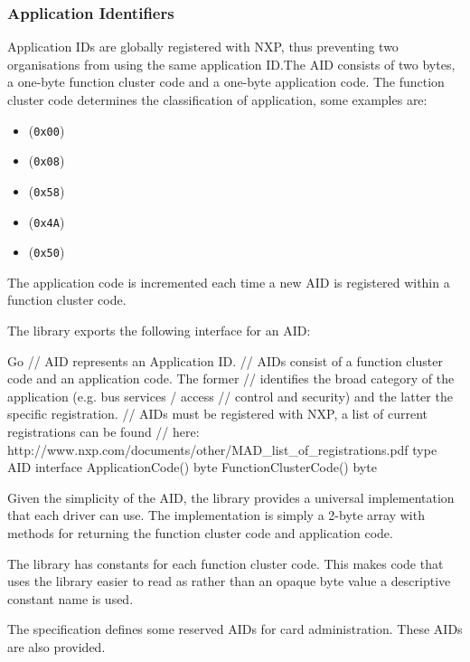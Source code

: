 \documentclass[dissertation.tex]{subfiles}
\begin{document}
  \subsubsection{Application Identifiers}
  Application IDs are globally registered with NXP, thus preventing two organisations from using the same application ID.\@ The AID consists of two bytes, a one-byte function cluster code and a one-byte application code. The function cluster code determines the classification of application, some examples are:

  \begin{itemize}
    \item {} (\texttt{0x00})
    \item {} (\texttt{0x08})
    \item {} (\texttt{0x58})
    \item {} (\texttt{0x4A})
    \item {} (\texttt{0x50})
  \end{itemize}

  The application code is incremented each time a new AID is registered within a function cluster code.

  The library exports the following interface for an AID:\@
  \begin{code}[numbers=none]{Go}
    // AID represents an Application ID.
    // AIDs consist of a function cluster code and an application code. The former
    // identifies the broad category of the application (e.g. bus services / access
    // control and security) and the latter the specific registration.
    // AIDs must be registered with NXP, a list of current registrations can be found
    // here: http://www.nxp.com/documents/other/MAD_list_of_registrations.pdf
    type AID interface {
    	ApplicationCode() byte
    	FunctionClusterCode() byte
    }
  \end{code}

  Given the simplicity of the AID, the library provides a universal implementation that each driver can use. The implementation is simply a 2-byte array with methods for returning the function cluster code and application code.

  The library has constants for each function cluster code. This makes code that uses the library easier to read as rather than an opaque byte value a descriptive constant name is used.

  The \mifare{} specification defines some reserved AIDs for card administration. These AIDs are also provided.
\end{document}
